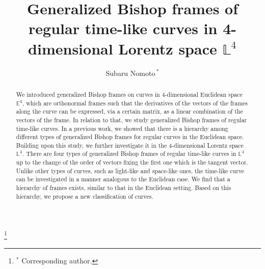 \documentclass[a4paper]{amsart}
\theoremstyle{definition}
\theoremstyle{remark}
\numberwithin{equation}{section}
\begin{document}
\title{Generalized Bishop frames of regular time-like curves in 4-dimensional Lorentz space $\mathbb{L}^{4}$}
\begin{abstract}
    We introduced generalized Bishop frames on curves in 4-dimensional Euclidean space $\mathbb{E}^{4}$, which are orthonormal frames such that the derivatives of the vectors of the frames along the curve can be expressed, via a certain matrix, as a linear combination of the vectors of the frame.
    In relation to that, we study generalized Bishop frames of regular time-like  curves. In a previous work, we showed that there is a hierarchy among different types of generalized Bishop frames for regular curves in the Euclidean space. Building upon this study, we further investigate it in the 4-dimensional Lorentz space $\mathbb{L}^4$. There are four types of generalized Bishop frames of regular time-like curves in $\mathbb{L}^{4}$ up to the change of the order of vectors fixing the first one which is the tangent vector. Unlike other types of curves, such as light-like and space-like ones, the time-like curve can be investigated in a manner analogous to the Euclidean case. We find that a hierarchy of frames exists, similar to that in the Euclidean setting. Based on this hierarchy, we propose a new classification of curves.
 \end{abstract}
\author{Subaru Nomoto$\,{}^{*}$}
\thanks{${}^{*}$ Corresponding author.}
\address{Department of Mathematical Sciences, Colleges of Science and Engineering, Ritsumeikan University, Nojihigashi 1-1-1, Kusatsu, Shiga, 525-8577, Japan}



\date{}


  \maketitle %

 
\end{document}

